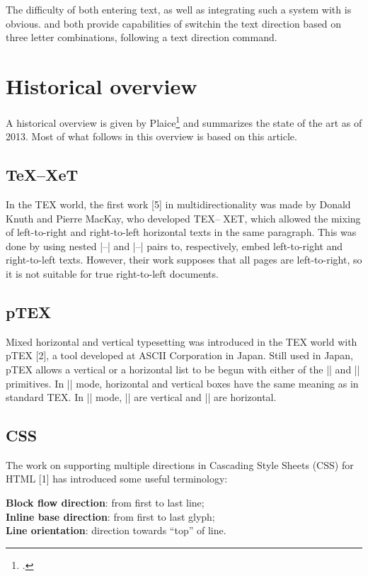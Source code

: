 The difficulty of both entering text, as well as integrating such a system with \tex is obvious. \xetex and \luatex both provide capabilities of switchin the text direction based on three letter combinations, following a text direction command.

\section{Historical overview}
A historical overview is given by Plaice\footcite{plaice2013} and summarizes the state of the art as of 2013. Most of what follows in this overview is based on this article.

\subsection{TeX–XeT}
In the TEX world, the first work [5] in multidirectionality
was made by Donald Knuth and Pierre
MacKay, who developed TEX– XET, which allowed
the mixing of left-to-right and right-to-left horizontal
texts in the same paragraph. This was done by using
nested |\beginL–\endL| and |\beginR–\endR| pairs
to, respectively, embed left-to-right and right-to-left
texts. However, their work supposes that all pages
are left-to-right, so it is not suitable for true right-to-left
documents.

\subsection{pTEX}

Mixed horizontal and vertical typesetting was introduced
in the TEX world with pTEX [2], a tool
developed at ASCII Corporation in Japan. Still used
in Japan, pTEX allows a vertical or a horizontal list
to be begun with either of the |\yoko| and |\tate|
primitives. In |\yoko| mode, horizontal and vertical
boxes have the same meaning as in standard TEX. In
|\tate| mode, |\hboxes| are vertical and |\vboxes| are
horizontal.

\subsection{CSS}

The work on supporting multiple directions in Cascading
Style Sheets (CSS) for HTML [1] has introduced
some useful terminology:

\textbf{Block flow direction}: from first to last line;\\
\textbf{Inline base direction}: from first to last glyph;\\
\textbf{Line orientation}: direction towards “top” of line.

